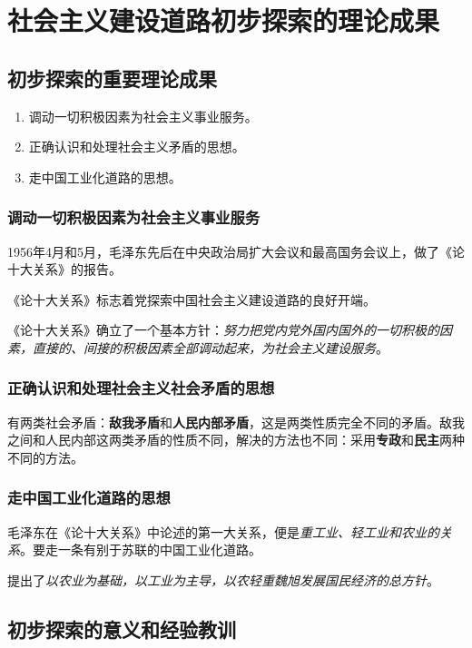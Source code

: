 \chapter{社会主义建设道路初步探索的理论成果}

\section{初步探索的重要理论成果}
\begin{enumerate}
    \item 调动一切积极因素为社会主义事业服务。
    \item 正确认识和处理社会主义矛盾的思想。
    \item 走中国工业化道路的思想。
\end{enumerate}

    \subsection{调动一切积极因素为社会主义事业服务}
    1956年4月和5月，毛泽东先后在中央政治局扩大会议和最高国务会议上，做了《论十大关系》的报告。

    《论十大关系》标志着党探索中国社会主义建设道路的良好开端。

    《论十大关系》确立了一个基本方针：\emph{努力把党内党外国内国外的一切积极的因素，直接的、间接的积极因素全部调动起来，为社会主义建设服务}。

    \subsection{正确认识和处理社会主义社会矛盾的思想}
    有两类社会矛盾：\textbf{敌我矛盾}和\textbf{人民内部矛盾}，这是两类性质完全不同的矛盾。敌我之间和人民内部这两类矛盾的性质不同，解决的方法也不同：采用\textbf{专政}和\textbf{民主}两种不同的方法。

    \subsection{走中国工业化道路的思想}
    毛泽东在《论十大关系》中论述的第一大关系，便是\emph{重工业、轻工业和农业的关系}。要走一条有别于苏联的中国工业化道路。

    提出了\emph{以农业为基础，以工业为主导，以农轻重魏旭发展国民经济的总方针}。


\section{初步探索的意义和经验教训}

